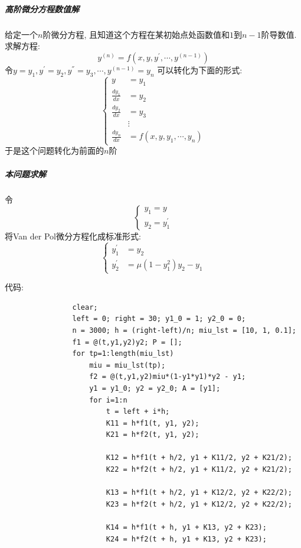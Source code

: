 \documentclass{article}
\begin{document}
\begin{CJK*}{UTF8}{song}
			\subparagraph{高阶微分方程数值解}
				给定一个$n$阶微分方程, 且知道这个方程在某初始点处函数值和$1$到$n-1$阶导数值.求解方程:
				$$y^{\left(n\right)} = f\left(x,y,y^{'},\cdots,y^{\left(n-1 \right)} \right)$$
				令$y = y_1, y^{'} = y_2, y^{''} = y_3, \cdots, y^{\left(n-1\right)} = y_{n}$
				可以转化为下面的形式:
				$$\left\{
					\begin{aligned}
						y &= y_1 \\
						\frac{dy_1}{dx} &= y_2 \\
						\frac{dy_2}{dx} &= y_3 \\
						&\vdots \\ 
						\frac{dy_{n}}{dx} &= f\left(x,y,y_1,\cdots,y_{n}\right)
					\end{aligned}
				\right.$$
				于是这个问题转化为前面的$n$阶
			\subparagraph{本问题求解}
			令$$\left\{
				\begin{aligned}
					y_1 = y \\
					y_2 = y_1^{'}
				\end{aligned}
			 \right.$$
			 将Van der Pol微分方程化成标准形式:
			 $$\left\{
			 	\begin{aligned}
			 		y_1^{'} &= y_2 \\
			 		y_2^{'} &= \mu \left(1-y_1^2 \right)y_2 - y_1
			 	\end{aligned}
			 \right.$$
			 
			 代码:
			 
			 \begin{lstlisting}
			 	clear;
			 	left = 0; right = 30; y1_0 = 1; y2_0 = 0;
			 	n = 3000; h = (right-left)/n; miu_lst = [10, 1, 0.1];
			 	f1 = @(t,y1,y2)y2; P = [];
			 	for tp=1:length(miu_lst)
			 		miu = miu_lst(tp);
			 		f2 = @(t,y1,y2)miu*(1-y1*y1)*y2 - y1;
			 		y1 = y1_0; y2 = y2_0; A = [y1];
			 		for i=1:n
			 			t = left + i*h;
			 			K11 = h*f1(t, y1, y2);
			 			K21 = h*f2(t, y1, y2);
			 	
			 			K12 = h*f1(t + h/2, y1 + K11/2, y2 + K21/2);
					 	K22 = h*f2(t + h/2, y1 + K11/2, y2 + K21/2);
			 	
			 			K13 = h*f1(t + h/2, y1 + K12/2, y2 + K22/2);
					 	K23 = h*f2(t + h/2, y1 + K12/2, y2 + K22/2);
			 	
			 			K14 = h*f1(t + h, y1 + K13, y2 + K23);
					 	K24 = h*f2(t + h, y1 + K13, y2 + K23);
			 	

\end{lstlisting}
\end{CJK*}
\end{document}
